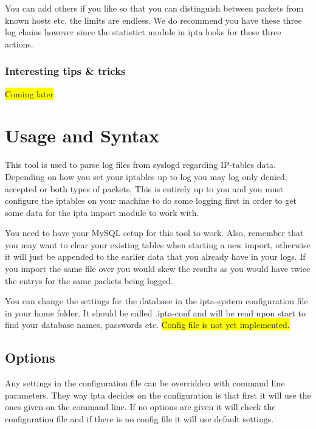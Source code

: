 \documentclass[english,twoside,openright,a4paper,12pt]{article}
\newcommand{\hilight}[1]{\colorbox{yellow}{#1}}
\begin{document}
You can add others if you like so that you can distinguish between packets from known hosts etc, the limits are endless. We do recommend you have these three log chains however since the statistict module in ipta looks for these three actions.

\subsubsection{Interesting tips \& tricks}

\hilight{Coming later}


\section{Usage and Syntax}

This tool is used to parse log files from syslogd regarding IP-tables data. Depending on how 
you set your iptables up to log you may log only denied, accepted or both types of packets. This 
is entirely up to you and you must configure the iptables on your machine to do some logging 
first in order to get some data for the ipta import module to work with. 
 
You need to have your MySQL setup for this tool to work. Also, remember that you may want 
to clear your existing tables when starting a new import, otherwise it will just be appended to the earlier data that you already have in your logs. If you import the same file over you would skew the results as you would have twice the entrys for the same packets being logged.
 
You can change the settings for the database in the ipta-system configuration file in your 
home folder. It should be called .ipta-conf and will be read upon start to find your database 
names, passwords etc. \hilight{Config file is not yet implemented.}

\subsection{Options}

Any settings in the configuration file can be overridden with command line parameters. They way ipta decides on the configuration is that first it will use the ones given on the command line. If no options are given it will check the configuration file and if there is no config file it will use default settings.
\end{document}
